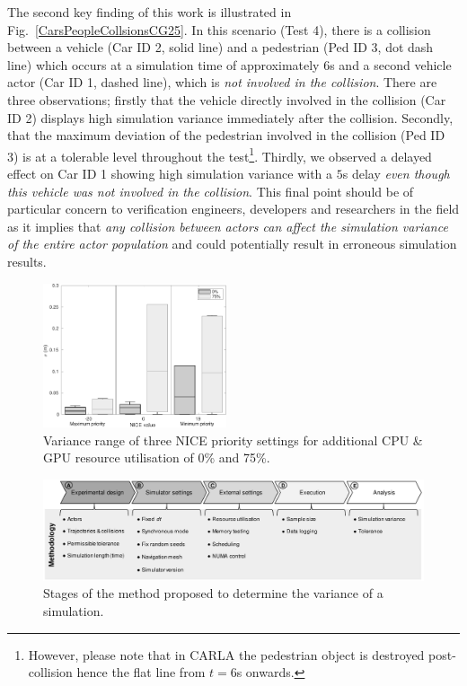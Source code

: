 The second key finding of this work is illustrated in Fig.~\ref{CarsPeopleCollsionsCG25}. In this scenario (Test 4), there is a collision between a vehicle (Car ID 2, solid line) and a pedestrian (Ped ID 3, dot dash line) which occurs at a simulation time of approximately $6$s and a second vehicle actor (Car ID 1, dashed line), which is \textit{not involved in the collision}. There are three observations; firstly that the vehicle directly involved in the collision (Car ID 2) displays high simulation variance immediately after the collision. Secondly, that the maximum deviation of the pedestrian involved in the collision (Ped ID 3) is at a tolerable level throughout the test\footnote{However, please note that in CARLA the pedestrian object is destroyed post-collision hence the flat line from $t=6$s onwards.}. Thirdly, we observed a delayed effect on Car ID 1 showing high simulation variance with a $5$s delay \textit{even though this vehicle was not involved in the collision}. This final point should be of particular concern to verification engineers, developers and researchers in the field as it implies that \textit{any collision between actors can affect the simulation variance of the entire actor population} and could potentially result in  erroneous simulation results. %

\begin{figure}[t]
    \centering
    \includegraphics[width=0.48\textwidth]{../other/figures/NICE_analysis_summary_V4.pdf}
    \caption{Variance range of three NICE priority settings for additional CPU \& GPU resource utilisation of 0\% and 75\%.}
    \label{NICEExperimentStressSummary}
\end{figure}

\begin{figure}[t]
    \centering
    \includegraphics[width=0.99\linewidth]{../other/figures/Methodology_Diagram_v8.pdf}
    \caption{Stages of the method proposed to determine the variance of a simulation.}
    \label{method_diagram}
\end{figure}

